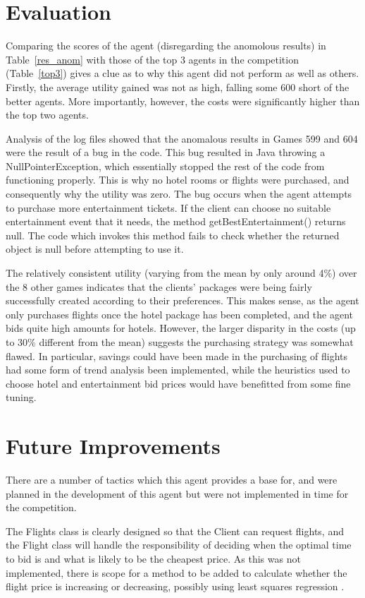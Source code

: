 \documentclass{acm_proc_article-sp}
\begin{document}
\section{Evaluation}
 \label{eval}
 Comparing the scores of the agent (disregarding the anomolous results) in Table~\ref{res_anom} with those of the top 3 agents in the competition (Table~\ref{top3}) gives a clue as to why this agent did not perform as well as others.  Firstly, the average utility gained was not as high, falling some 600 short of the better agents.  More importantly, however, the costs were significantly higher than the top two agents.

 Analysis of the log files showed that the anomalous results in Games 599 and 604 were the result of a bug in the code.  This bug resulted in Java throwing a NullPointerException, which essentially stopped the rest of the code from functioning properly.  This is why no hotel rooms or flights were purchased, and consequently why the utility was zero.  The bug occurs when the agent attempts to purchase more entertainment tickets.  If the client can choose no suitable entertainment event that it needs, the method getBestEntertainment() returns null.  The code which invokes this method fails to check whether the returned object is null before attempting to use it.
 
 The relatively consistent utility (varying from the mean by only around 4\%) over the 8 other games indicates that the clients' packages were being fairly successfully created according to their preferences.  This makes sense, as the agent only purchases flights once the hotel package has been completed, and the agent bids quite high amounts for hotels.  However, the larger disparity in the costs (up to 30\% different from the mean) suggests the purchasing strategy was somewhat flawed. In particular, savings could have been made in the purchasing of flights had some form of trend analysis been implemented, while the heuristics used to choose hotel and entertainment bid prices would have benefitted from some fine tuning.
 
\section{Future Improvements}
 \label{future}
 There are a number of tactics which this agent provides a base for, and were planned in the development of this agent but were not implemented in time for the competition.
 
 The Flights class is clearly designed so that the Client can request flights, and the Flight class will handle the responsibility of deciding when the optimal time to bid is and what is likely to be the cheapest price.  As this was not implemented, there is scope for a method to be added to calculate whether the flight price is increasing or decreasing, possibly using least squares regression \cite{Vytelingum2007}.
 
\end{document}
